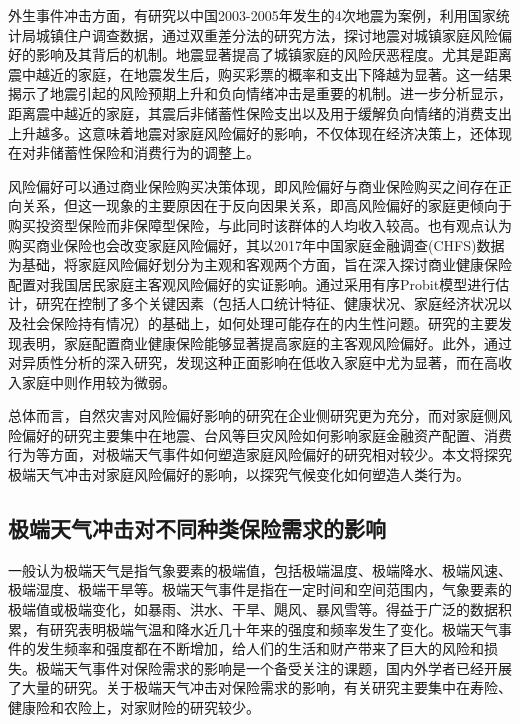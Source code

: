 外生事件冲击方面，有研究以中国2003-2005年发生的4次地震为案例，利用国家统计局城镇住户调查数据，通过双重差分法的研究方法，探讨地震对城镇家庭风险偏好的影响及其背后的机制\citep{章元0地震冲击对风险偏好的影响}。地震显著提高了城镇家庭的风险厌恶程度。尤其是距离震中越近的家庭，在地震发生后，购买彩票的概率和支出下降越为显著。这一结果揭示了地震引起的风险预期上升和负向情绪冲击是重要的机制。进一步分析显示，距离震中越近的家庭，其震后非储蓄性保险支出以及用于缓解负向情绪的消费支出上升越多。这意味着地震对家庭风险偏好的影响，不仅体现在经济决策上，还体现在对非储蓄性保险和消费行为的调整上。

风险偏好可以通过商业保险购买决策体现，即风险偏好与商业保险购买之间存在正向关系\citep{宋章良2021我国中老年家庭风险偏好对商业保险购买行为的影响研究}，但这一现象的主要原因在于反向因果关系，即高风险偏好的家庭更倾向于购买投资型保险而非保障型保险，与此同时该群体的人均收入较高。也有观点认为购买商业保险也会改变家庭风险偏好\citep{孙武军2023商业健康保险的配置能够改变家庭的风险偏好吗}，其以2017年中国家庭金融调查(CHFS)数据为基础，将家庭风险偏好划分为主观和客观两个方面，旨在深入探讨商业健康保险配置对我国居民家庭主客观风险偏好的实证影响。通过采用有序Probit模型进行估计，研究在控制了多个关键因素（包括人口统计特征、健康状况、家庭经济状况以及社会保险持有情况）的基础上，如何处理可能存在的内生性问题。研究的主要发现表明，家庭配置商业健康保险能够显著提高家庭的主客观风险偏好。此外，通过对异质性分析的深入研究，发现这种正面影响在低收入家庭中尤为显著，而在高收入家庭中则作用较为微弱。

总体而言，自然灾害对风险偏好影响的研究在企业侧研究更为充分，而对家庭侧风险偏好的研究主要集中在地震、台风等巨灾风险如何影响家庭金融资产配置、消费行为等方面，对极端天气事件如何塑造家庭风险偏好的研究相对较少。本文将探究极端天气冲击对家庭风险偏好的影响，以探究气候变化如何塑造人类行为。

\subsection{极端天气冲击对不同种类保险需求的影响}

一般认为极端天气是指气象要素的极端值，包括极端温度、极端降水、极端风速、极端湿度、极端干旱等\citep{傅良2022ECMWF,吴大明2021近年来全球极端天气气候事件情况及影响分析}。极端天气事件是指在一定时间和空间范围内，气象要素的极端值或极端变化，如暴雨、洪水、干旱、飓风、暴风雪等。得益于广泛的数据积累，有研究表明极端气温和降水近几十年来的强度和频率发生了变化\citep{ummenhofer2017extreme}。极端天气事件的发生频率和强度都在不断增加，给人们的生活和财产带来了巨大的风险和损失。极端天气事件对保险需求的影响是一个备受关注的课题，国内外学者已经开展了大量的研究。关于极端天气冲击对保险需求的影响，有关研究主要集中在寿险、健康险和农险上，对家财险的研究较少。

